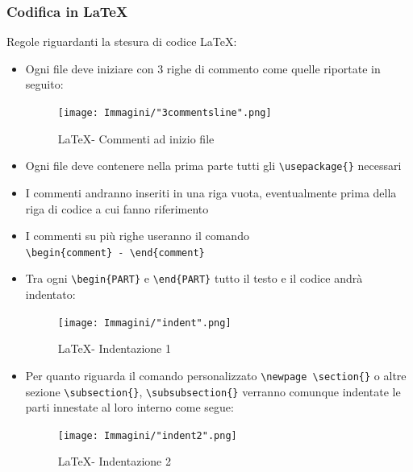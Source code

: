 \documentclass[a4paper]{article}
\begin{document}
		\subsubsection{Codifica in \LaTeX}
		Regole riguardanti la stesura di codice \LaTeX :
		\begin{itemize}
			\item Ogni file deve iniziare con 3 righe di commento come quelle riportate in seguito:
			\begin{figure}[H]
				\centering
				\texttt{[image: Immagini/"3commentsline".png]}
				\caption{\LaTeX \space - Commenti ad inizio file}
			\end{figure}
			\item Ogni file deve contenere nella prima parte tutti gli \verb|\usepackage{}| necessari
			\item I commenti andranno inseriti in una riga vuota, eventualmente prima della riga di
			codice a cui fanno riferimento
			\item I commenti su più righe useranno il comando \\ \verb|\begin{comment} - \end{comment}|
			\item Tra ogni \verb|\begin{PART}| e \verb|\end{PART}| tutto il testo e il codice andrà indentato:
			\begin{figure}[H]
				\centering
				\texttt{[image: Immagini/"indent".png]}
				\caption{\LaTeX \space - Indentazione 1}
			\end{figure}
			\item Per quanto riguarda il comando personalizzato \verb|\newpage \section{}| o altre sezione \verb|\subsection{}|, \verb|\subsubsection{}|
			verranno comunque indentate le parti innestate al loro interno come segue:
			\begin{figure}[H]
				\centering
				\texttt{[image: Immagini/"indent2".png]}
				\caption{\LaTeX \space - Indentazione 2}

\end{figure}
\end{itemize}
\end{document}
